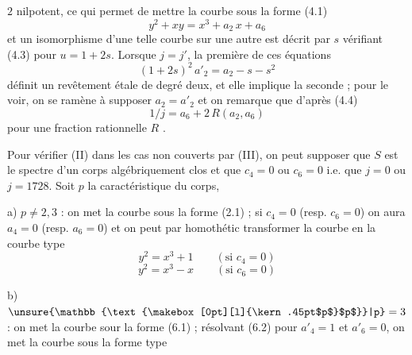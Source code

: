 %
\space
$2$ nilpotent, ce qui permet de mettre la courbe sous la forme (4.1)
\[
y^2+xy=x^3+a_2\,x+a_6
\]
et un isomorphisme d'une telle courbe sur une autre est décrit par $s$ vérifiant (4.3) pour $u=1+2s$. Lorsque $j=j'$, la première de ces équations
\[
(1+2s)^2\,a'_2=a_2-s-s^2
\]
définit un revêtement étale de degré deux, et elle implique la seconde ; pour le voir, on se ramène à supposer $a_2=a'_2$ et on remarque que d'après (4.4)
\[
1/j=a_6+2\,R(a_2,a_6)
\]
pour une fraction rationnelle $R$ .

Pour vérifier (II) dans les cas non couverts par (III), on peut supposer que $S$ est le spectre d'un corps algébriquement clos et que $c_4=0$ ou $c_6=0$  i.e. que $j=0$ ou $j=1728$. Soit $p$ la caractéristique du corps,

a) $p\ne 2,3$ : on met la courbe sous la forme (2.1) ; si $c_4=0$ (resp. $c_6=0$) on aura $a_4=0$ (resp. $a_6=0$) et on peut par homothétic transformer la courbe en la courbe type
\[
y^2=x^3+1 \qquad (\text{si }c_4=0) \tag*{(6.5)}
\]
\[
y^2=x^3-x \qquad (\text{si }c_6=0) \tag*{(6.6)}
\]

b) $\unsure{\mathbb{\text{\makebox[0pt][l]{\kern.45pt$p$}$p$}}|p}=3$ : on met la courbe sour la forme (6.1) ; résolvant (6.2) pour $a'_4=1$ et $a'_6=0$, on met la courbe sous la forme type%
